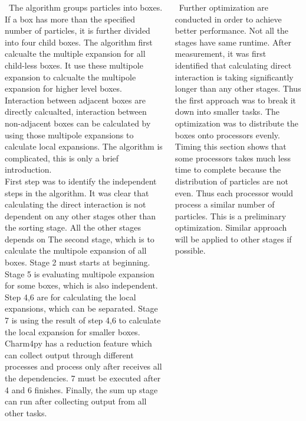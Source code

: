 \documentclass[final,t]{beamer}
\begin{document}
\begin{frame}[fragile]{}
\begin{columns}[t]
\begin{column}{.45\linewidth}
      \begin{tcolorbox}[toplevelbox,adjusted title=Tech Detail 1]
        \ The algorithm groups particles into boxes. If a box has more than the specified
        number of particles, it is further divided into four child boxes. The algorithm first calcualte the multiple expansion for all child-less boxes. It use these
        multipole expansion to calcualte the multipole expansion for higher level boxes.
        Interaction between adjacent boxes are directly calcualted, interaction between
        non-adjacent boxes can be calculated by using those multipole expansions to calculate local expansions. The algorithm is complicated, this is only a brief introduction.
        \\ First step was to identify the independent steps in the algorithm. It was clear that calculating the direct interaction is not dependent on any other stages other than the sorting stage. All the other stages depends on The second stage, which is to calculate the multipole expansion of all boxes. Stage 2 must starts at beginning. Stage 5 is evaluating multipole expansion for some boxes, which is also independent. Step 4,6 are for calculating the local expansions, which can be separated. Stage 7 is using the result of step 4,6 to calculate the local expansion for smaller boxes. Charm4py has a reduction feature which can
        collect output through different processes and process only after receives all
        the dependencies. 7 must be executed after 4 and 6 finishes. Finally, the sum up stage can run after collecting output from all other tasks.
      \end{tcolorbox}

    \end{column}



    \begin{column}{.45\linewidth}
      \begin{tcolorbox}[toplevelbox,adjusted title=Tech Detail 2]
        \ Further optimization are conducted in order to achieve better performance. Not all the stages have same runtime. After measurement, it was first identified that 
        calculating direct interaction is taking significantly longer than any other stages. Thus the first approach was to break it down into smaller tasks. The optimization was to distribute the boxes onto processors evenly. Timing this section shows that some processors takes much less time to complete because the distribution of particles are not even. Thus each processor would process a similar number of particles. This is a preliminary optimization. Similar approach will be applied to other stages if possible.
      \end{tcolorbox}


\end{column}
\end{columns}
\end{frame}
\end{document}

